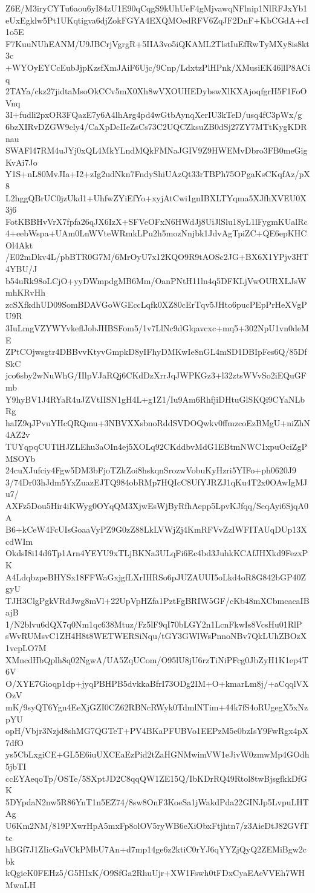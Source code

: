 Z6E/M3iryCYTu6aou6yI84zU1E90qCqgS9kUhUeF4gMjvawqNFlnip1NlRFJxYb1
eUxEgklw5Pt1UKqtigva6djZokFGYA4EXQMOedRFV6ZqJF2DnF+KbCGdA+cI1o5E
F7KuuNUhEANM/U9JBCrjVgrgR+5IIA3vo5iQKAML2TlstIuEfRwTyMXy8is8kt3c
+WYOyEYCcEubJjpKzsfXmJAiF6Ujc/9Cnp/LdxtzPlHPnk/XMusiEK46llP8ACiq
2TAYa/ckz27jidtaMsoOkCCv5mX0Xh8wVXOUHEDybswXlKXAjoqfgrH5F1FoOVnq
3I+fudli2pxOR3FQazE7y6A4lhArg4pd4wGtbAynqXerIU3kTeD/usq4fC3pWx/g
6bzXIRvDZGW9cly4/CaXpDcIIeZsCs73C2UQCZksuZB0dSj27ZY7MTtKygKDRnau
SWAFl47RM4uJYj0xQL4MkYLndMQkFMNaJGIV9Z9HWEMvDbro3FB0meGigKvAi7Jo
Y1S+nL80MvJIa+I2+zIg2udNkn7FndyShiUAzQt33rTBPh75OPgaKsCKqfAz/pX8
L2hggQBrUC0jzUkd1+UhfwZYiEfYo+xyjAtCwi1gnIBXLTYqma5XJfhXVEU0X3j6
FotKBBHvVrX7fpfa26qJX6IzX+SFVeOFxN6HWdJj8UiJlSlu18yL1lFygmKUalRc
4+eebWspa+UAm0LnWVteWRmkLPu2h5mozNnjbk1JdvAgTpiZC+QE6epKHCOl4Akt
/E02mDkv4L/pbBTR0G7M/6MrOyU7x12KQO9R9tAOSc2JG+BX6X1YPjv3HT4YBU/J
b54uRk98oLCjO+yyDWmpdgMB6Mm/OanPNtH11ln4q5DFKLjVwOURXLJsWmhKRvHh
zcSXfkdhUD09SomBDAVGoWGEccLqfk0XZ80cErTqv5JHto6pucPEpPrHeXVgPU9R
3IuLmgVZYWYvkeflJobJHBSFom5/1v7LlNc9dGlqavcxc+mq5+302NpU1vn0deME
ZPtCOjwsgtr4DBBvvKtyvGmpkD8yIFhyDMKwIe8nGL4mSD1DBIpFes6Q/85DfSkC
jco6sby2wNuWhG/IIlpVJaRQj6CKdDzXrrJqJWPKGz3+l32ztsWVvSo2iEQuGFmb
Y9hyBV1J4RYaR4uJZVtIISN1gH4L+g1Z1/Iu9Am6RhfjiDHtuGlSKQi9CYaNLbRg
haIZ9qJPvuYHcQRQmu+3NBVXXsbnoRddSVDOQwkv0ffmzcoEzBMgU+niZhN4AZ2v
TUYqpqCUTlHJZLEhu3aOIn4ej5XOLq92CKddbvMdG1EBtmNWC1xpuOciZgPMSOYb
24cuXJufciy4Fgw5DM3bFjoTZhZoi8hskqnSrozwVobuKyHzri5YIFo+ph0620J9
3/74Dr03hJdm5YxZuazEJTQ984obRMp7HQIcC8UfYJRZJ1qKu4T2x0OAwIgMJu7/
AXFz5Dou5Hir4iKWyg0OYqQM3XjwEsWjByRfhAepp5LpvKJfqq/ScqAyi6SjqA0A
B6+kCeW4FcUIsGoaaVyPZ9G0zZ88LkLVWjZj4KmRFVvZzIWFITAUqDUp13XcdWIm
OkdsI8i14d6Tp1Arn4YEYU9xTLjBKNa3ULqFi6Ec4bd3JuhkKCAfJHXkd9FezxPK
A4LdqbzpeBHYSx18FFWaGxjgfLXrIHRSo6pJUZAUUI5oLkd4oR8G842bGP40ZgyU
TJH3ClgPgkVRdJwg8mVl+22UpVpHZfa1PztFgBRIW5GF/cKb48mXCbmcacaIBajB
1/N2blvu6dQX7q0Nm1qc638Mtuz/Fz5lF9qI70bLGY2n1LcnFkwIs8VcsHu01RlP
sWvRUMsvC1ZH4H8t8WETWERSiNqu/tGY3GWlWsPnnoNBv7QkLUhZBOzX1vcpLO7M
XMncdHbQplh8q02NgwA/UA5ZqUCom/O95lU8jU6rzTiNiPFcg0JbZyH1K1ep4T6V
O/XYE7Gioqp1dp+jyqPBHPB5dvkkaBfrI73ODg2IM+O+kmarLm8j/+aCqqlVXOzV
mK/9syQT6Ygn4EeXjGZI0CZ62RBNcRWyk0TdmlNTim+44k7fS4oRUgegX5xNzpYU
opH/Vbjr3Nzjd8shMG7QGTeT+PV4BKaPFUBVo1EEPzM5e0bzIsY9FwRgx4pX7dfO
ys5CbLxgiCE+GL5E6iuUXCEaEzPid2tZaHGNMwimVW1eJivW0zmwMp4GOdh5jbTI
ccEYAeqoTp/OSTe/5SXptJD2C8qqQW1ZE15Q/IbKDrRQ49Rtol8twBjsgfkkDfGK
5DYpdaN2nw5R86YnT1n5EZ74/8sw8OnF3KoeSa1jWakdPda22GINJp5LvpuLHTAg
U6Km2NM/819PXwrHpA5mxFp8olOV5ryWB6eXiObxFtjhtn7/z3AieDtJ82GVfTtc
hBGf7J1ZIicGnVCkPMbU7An+d7mp14ge6z2ktiC0rYJ6qYYZjQyQ2ZEMiBgw2cbk
kQgieK0FEHz5/G5HIxK/O9SfGa2RhuUjr+XW1Fswh0tFDxCyaEAeVVEh7WHMwnLH
